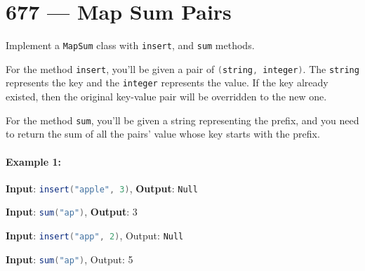 \section{677 --- Map Sum Pairs}
Implement a \lstinline[language=Java, basicstyle=\small\ttfamily, keywordstyle=\bfseries\color{green!40!black}]|MapSum| class with \lstinline[language=Java, basicstyle=\small\ttfamily, keywordstyle=\bfseries\color{green!40!black}]|insert|, and \lstinline[language=Java, basicstyle=\small\ttfamily, keywordstyle=\bfseries\color{green!40!black}]|sum| methods.

For the method \lstinline[language=Java, basicstyle=\small\ttfamily, keywordstyle=\bfseries\color{green!40!black}]|insert|, you'll be given a pair of \lstinline[language=Java, basicstyle=\small\ttfamily, keywordstyle=\bfseries\color{green!40!black}]|(string, integer)|. The \lstinline[language=Java, basicstyle=\small\ttfamily, keywordstyle=\bfseries\color{green!40!black}]|string| represents the key and the \lstinline[language=Java, basicstyle=\small\ttfamily, keywordstyle=\bfseries\color{green!40!black}]|integer| represents the value. If the key already existed, then the original key-value pair will be overridden to the new one.

For the method \lstinline[language=Java, basicstyle=\small\ttfamily, keywordstyle=\bfseries\color{green!40!black}]|sum|, you'll be given a string representing the prefix, and you need to return the sum of all the pairs' value whose key starts with the prefix.

\paragraph{Example 1:}

\begin{flushleft}


\textbf{Input}: \lstinline[language=Java, basicstyle=\small\ttfamily, keywordstyle=\bfseries\color{green!40!black}]|insert("apple", 3)|, \textbf{Output}: \lstinline[language=Java, basicstyle=\small\ttfamily, keywordstyle=\bfseries\color{green!40!black}]|Null|

\textbf{Input}: \lstinline[language=Java, basicstyle=\small\ttfamily, keywordstyle=\bfseries\color{green!40!black}]|sum("ap")|, \textbf{Output}: 3

\textbf{Input}: \lstinline[language=Java, basicstyle=\small\ttfamily, keywordstyle=\bfseries\color{green!40!black}]|insert("app", 2)|, Output: \lstinline[language=Java, basicstyle=\small\ttfamily, keywordstyle=\bfseries\color{green!40!black}]|Null|

\textbf{Input}: \lstinline[language=Java, basicstyle=\small\ttfamily, keywordstyle=\bfseries\color{green!40!black}]|sum("ap")|, Output: 5

\end{flushleft}


